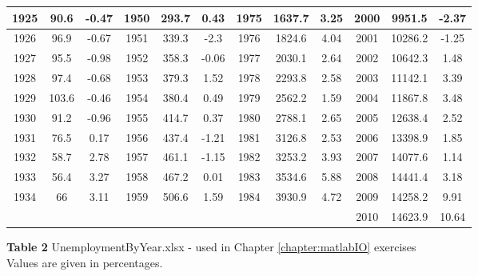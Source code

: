 \begin{tabular}{|c|c|c||c|c|c||c|c|c||c|c|c|}
1925&	90.6&	-0.47&	1950&	293.7&	0.43&	1975&	1637.7&	3.25&	2000&	9951.5&	-2.37\\ \hline
1926&	96.9&	-0.67&	1951&	339.3&	-2.3&	1976&	1824.6&	4.04&	2001&	10286.2&	-1.25\\ \hline
1927&	95.5&	-0.98&	1952&	358.3&	-0.06&	1977&	2030.1&	2.64&	2002&	10642.3&	1.48\\ \hline
1928&	97.4&	-0.68&	1953&	379.3&	1.52&	1978&	2293.8&	2.58&	2003&	11142.1&	3.39\\ \hline
1929&	103.6&	-0.46&	1954&	380.4&	0.49&	1979&	2562.2&	1.59&	2004&	11867.8&	3.48\\ \hline
1930&	91.2&	-0.96&	1955&	414.7&	0.37&	1980&	2788.1&	2.65&	2005&	12638.4&	2.52\\ \hline
1931&	76.5&	0.17&	1956&	437.4&	-1.21&	1981&	3126.8&	2.53&	2006&	13398.9&	1.85\\ \hline
1932&	58.7&	2.78&	1957&	461.1&	-1.15&	1982&	3253.2&	3.93&	2007&	14077.6&	1.14\\ \hline
1933&	56.4&	3.27&	1958&	467.2&	0.01&	1983&	3534.6&	5.88&	2008&	14441.4&	3.18\\ \hline
1934&	66&	3.11&	1959&	506.6&	1.59&	1984&	3930.9&	4.72&	2009&	14258.2&	9.91\\ \hline
	&&&&&&&&&								2010&	14623.9&	10.64\\ 
\hline
\end{tabular}

\newpage
{\bf Table 2}\label{table:Unemployment} UnemploymentByYear.xlsx - used in Chapter \ref{chapter:matlabIO} exercises\\

Values are given in percentages.\\

